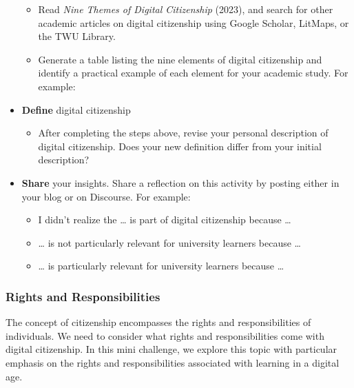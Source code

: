 \documentclass[
  letterpaper,
  DIV=11,
  numbers=noendperiod]{scrreprt}
\providecommand{\tightlist}{%
  \setlength{\itemsep}{0pt}\setlength{\parskip}{0pt}}\usepackage{longtable,booktabs,array}
\begin{document}
\begin{tcolorbox}
\begin{itemize}
  \begin{itemize}
  \tightlist
  \item
    Read \emph{Nine Themes of Digital Citizenship} (2023), and search
    for other academic articles on digital citizenship using Google
    Scholar, LitMaps, or the TWU Library.
  \item
    Generate a table listing the nine elements of digital citizenship
    and identify a practical example of each element for your academic
    study. For example:
  \end{itemize}
\item
  \textbf{Define} digital citizenship

  \begin{itemize}
  \tightlist
  \item
    After completing the steps above, revise your personal description
    of digital citizenship. Does your new definition differ from your
    initial description?
  \end{itemize}
\item
  \textbf{Share} your insights. Share a reflection on this activity by
  posting either in your blog or on Discourse. For example:

  \begin{itemize}
  \tightlist
  \item
    I didn't realize the \ldots{} is part of digital citizenship because
    \ldots{}
  \item
    \ldots{} is not particularly relevant for university learners
    because \ldots{}
  \item
    \ldots{} is particularly relevant for university learners because
    \ldots{}
  \end{itemize}
\end{itemize}

\end{tcolorbox}

\subsubsection*{Rights and
Responsibilities}\label{rights-and-responsibilities}

The concept of citizenship encompasses the rights and responsibilities
of individuals. We need to consider what rights and responsibilities
come with digital citizenship. In this mini challenge, we explore this
topic with particular emphasis on the rights and responsibilities
associated with learning in a digital age.
\end{document}
